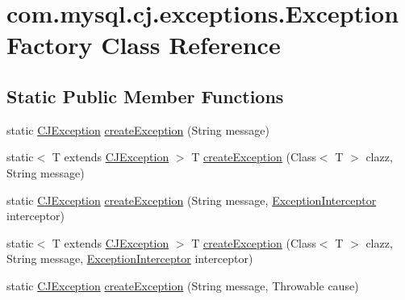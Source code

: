 \hypertarget{classcom_1_1mysql_1_1cj_1_1exceptions_1_1_exception_factory}{}\section{com.\+mysql.\+cj.\+exceptions.\+Exception\+Factory Class Reference}
\label{classcom_1_1mysql_1_1cj_1_1exceptions_1_1_exception_factory}
\subsection*{Static Public Member Functions}
\begin{DoxyCompactItemize}
\item 
static \mbox{\hyperlink{classcom_1_1mysql_1_1cj_1_1exceptions_1_1_c_j_exception}{C\+J\+Exception}} \mbox{\hyperlink{classcom_1_1mysql_1_1cj_1_1exceptions_1_1_exception_factory_a48cafb99fd5328ce70f8590201536130}{create\+Exception}} (String message)
\item 
static$<$ T extends \mbox{\hyperlink{classcom_1_1mysql_1_1cj_1_1exceptions_1_1_c_j_exception}{C\+J\+Exception}} $>$ T \mbox{\hyperlink{classcom_1_1mysql_1_1cj_1_1exceptions_1_1_exception_factory_ac29411eaa0b0c82e509e582c40f7b1b5}{create\+Exception}} (Class$<$ T $>$ clazz, String message)
\item 
static \mbox{\hyperlink{classcom_1_1mysql_1_1cj_1_1exceptions_1_1_c_j_exception}{C\+J\+Exception}} \mbox{\hyperlink{classcom_1_1mysql_1_1cj_1_1exceptions_1_1_exception_factory_acb21b0c4d8b1f4c02ab289264f33d13f}{create\+Exception}} (String message, \mbox{\hyperlink{interfacecom_1_1mysql_1_1cj_1_1exceptions_1_1_exception_interceptor}{Exception\+Interceptor}} interceptor)
\item 
static$<$ T extends \mbox{\hyperlink{classcom_1_1mysql_1_1cj_1_1exceptions_1_1_c_j_exception}{C\+J\+Exception}} $>$ T \mbox{\hyperlink{classcom_1_1mysql_1_1cj_1_1exceptions_1_1_exception_factory_a9fb33af1ff5bf7216c592339f88a3f46}{create\+Exception}} (Class$<$ T $>$ clazz, String message, \mbox{\hyperlink{interfacecom_1_1mysql_1_1cj_1_1exceptions_1_1_exception_interceptor}{Exception\+Interceptor}} interceptor)
\item 
static \mbox{\hyperlink{classcom_1_1mysql_1_1cj_1_1exceptions_1_1_c_j_exception}{C\+J\+Exception}} \mbox{\hyperlink{classcom_1_1mysql_1_1cj_1_1exceptions_1_1_exception_factory_a78018cc953e683b33315d1c8754440bc}{create\+Exception}} (String message, Throwable cause)
\item 

\end{DoxyCompactItemize}
